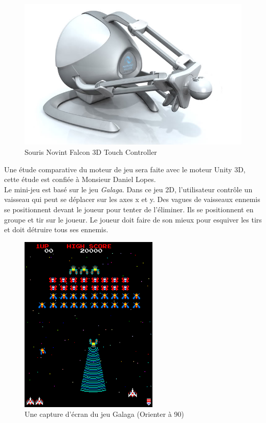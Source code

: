 \documentclass[11pt, a4paper]{article}
\begin{document}
\begin{figure}[h]
	\begin{center}
	\includegraphics[scale=.5]{falcon}
	\caption{Souris Novint Falcon 3D Touch Controller}
	\end{center}
\end{figure}

Une étude comparative du moteur de jeu sera faite avec le moteur Unity 3D, cette étude est confiée à Monsieur Daniel Lopes.\\[0.3cm]
Le mini-jeu est basé sur le jeu \textit{Galaga}. Dans ce jeu 2D, l'utilisateur contrôle un vaisseau qui peut se déplacer sur les axes x et y. Des vagues de vaisseaux ennemis se positionnent devant le joueur pour tenter de l'éliminer. Ils se positionnent en groupe et tir sur le joueur. Le joueur doit faire de son mieux pour esquiver les tirs et doit détruire tous ses ennemis.

\begin{figure}[h]
	\begin{center}
	\includegraphics[scale=1, angle=90]{Galaga}
	\caption{Une capture d'écran du jeu Galaga (Orienter à 90\degre)}
	\end{center}
\end{figure}
\newpage
\end{document}
